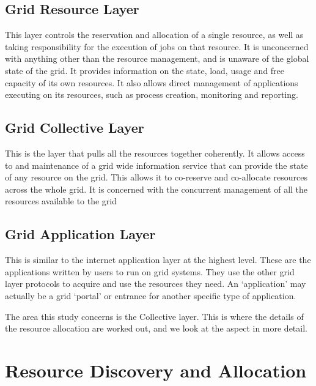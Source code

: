 \subsection{Grid Resource Layer}

This layer controls the reservation and allocation of a single resource, as
well as taking responsibility for the execution of jobs on that resource.  It
is unconcerned with anything other than the resource management, and is unaware
of the global state of the grid.  It provides information on the state, load,
usage and free capacity of its own resources.  It also allows direct management
of applications executing on its resources, such as process creation,
monitoring and reporting.


\subsection{Grid Collective Layer}

This is the layer that pulls all the resources together coherently.  It allows
access to and maintenance of a grid wide information service that can provide
the state of any resource on the grid.  This allows it to co-reserve and
co-allocate resources across the whole grid.  It is concerned with the
concurrent management of all the resources available to the grid

\subsection{Grid Application Layer}

This is similar to the internet application layer at the highest level.  These
are the applications written by users to run on grid systems.  They use the
other grid layer protocols to acquire and use the resources they need.  An
`application' may actually be a grid `portal' or entrance for another specific
type of application.


The area this study concerns is the Collective layer. This is where the
details of the resource allocation are worked out, and we look at the aspect in
more detail. 






\section{Resource Discovery and Allocation}
\label{SEC:GRID:ALLOCATION}

